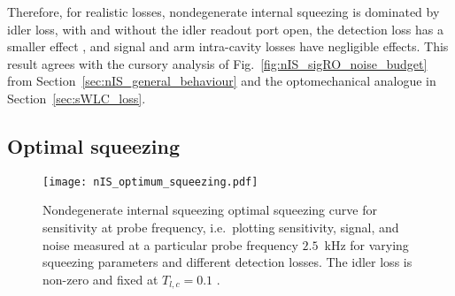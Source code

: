 Therefore, for realistic losses, nondegenerate internal squeezing is dominated by idler loss, with and without the idler readout port open, the detection loss has a smaller effect , and signal and arm intra-cavity losses have negligible effects. This result agrees with the cursory analysis of Fig.~\ref{fig:nIS_sigRO_noise_budget} from Section~\ref{sec:nIS_general_behaviour}  and the optomechanical analogue in Section~\ref{sec:sWLC_loss}.


\subsection{Optimal squeezing}
\label{sec:nIS_optimal_squeezing}

\begin{figure}
	\centering
	\texttt{[image: nIS\_optimum\_squeezing.pdf]}
	\caption{  Nondegenerate internal squeezing optimal squeezing curve for sensitivity at probe frequency, i.e.\ plotting sensitivity, signal, and noise measured at a particular probe frequency $2.5$~kHz for varying squeezing parameters and different detection losses. The idler loss is non-zero and fixed at $T_{l,c}=0.1$ .}
	\label{fig:nIS_optimum_squeezing}
\end{figure}


